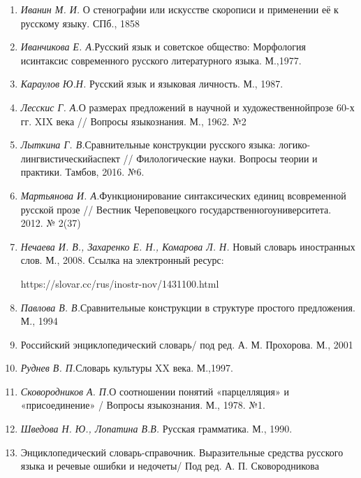 \begin{enumerate}
        \item \textit{Иванин М. И. }О стенографии или искусстве скорописи и применении её к русскому языку. СПб., 1858
        \item \textit{Иванчикова Е. А.}{Русский язык и советское общество: Морфология исинтаксис современного русского литературного языка. М.,1977.}
        \item \textit{Караулов  Ю.Н. }{Русский язык и языковая личность. М., 1987. }
        \item \textit{Лесскис Г. А.}О размерах предложений в научной и художественнойпрозе 60-х гг. XIX века // Вопросы языкознания. М., 1962. №2
        \item \textit{Лыткина Г. В.}Сравнительные конструкции русского языка: логико-лингвистическийаспект // Филологические науки. Вопросы теории и практики. Тамбов, 2016. №6.
        \item \textit{Мартьянова И. А.}Функционирование синтаксических единиц всовременной русской прозе // Вестник Череповецкого государственногоуниверситета. 2012. № 2(37)
        \item \textit{Нечаева И. В., Захаренко Е. Н., Комарова Л. Н. }Новый словарь иностранных слов. М., 2008. Ссылка на электронный ресурс:\par https://slovar.cc/rus/inostr-nov/1431100.html
        \item \textit{Павлова В. В.}Сравнительные конструкции в структуре простого предложения. М., 1994
        \item Российский энциклопедический словарь/ под ред. А. М. Прохорова. М., 2001 
        \item \textit{Руднев В. П.}Словарь культуры XX века. М.,1997.
        \item \textit{Сковородников А. П.}О соотношении понятий «парцелляция» и «присоединение» / Вопросы языкознания. М., 1978. №1.
        \item \textit{Шведова Н. Ю., Лопатина В.В. }Русская грамматика. М., 1990. 
        \item Энциклопедический словарь-справочник. Выразительные средства русского языка и речевые ошибки и недочеты/ Под ред. А. П. Сковородникова
      \end{enumerate}